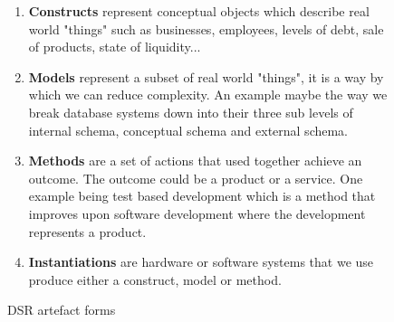 \begin{figure}[h]
\caption{DSR artefact forms} \label{fig:artefactforms}
\begin{enumerate}[label=Form \arabic*:, leftmargin=*]
    \item \textbf{Constructs} represent conceptual objects which describe real world "things" such as businesses, employees, levels of debt, sale of products, state of liquidity...

    \item \textbf{Models} represent a subset of real world "things", it is a way by which we can reduce complexity. An example maybe the way we break database systems down into their three sub levels of internal schema, conceptual schema and external schema.
    
    \item \textbf{Methods} are a set of actions that used together achieve an outcome. The outcome could be a product or a service. One example being test based development which is a method that improves upon software development where the development represents a product.
    
    \item \textbf{Instantiations} are hardware or software systems that we use produce either a construct, model or method. 
\end{enumerate}
\end{figure}